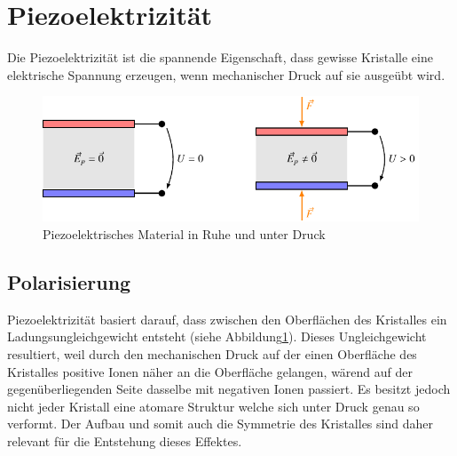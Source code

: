 \section{Piezoelektrizität}
Die Piezoelektrizität ist die spannende Eigenschaft, dass gewisse Kristalle eine elektrische Spannung erzeugen, wenn mechanischer Druck auf sie ausgeübt wird.

\begin{figure}
    \centering
    \includegraphics[]{papers/punktgruppen/figures/piezo} %
    \caption{Piezoelektrisches Material in Ruhe und unter Druck}
    \label{fig:punktgruppen:basicPiezo}
\end{figure}

\subsection{Polarisierung}
Piezoelektrizität basiert darauf, dass zwischen den Oberflächen des Kristalles ein Ladungsungleichgewicht entsteht (siehe Abbildung\ref{fig:punktgruppen:basicPiezo}).
Dieses Ungleichgewicht resultiert, 
weil durch den mechanischen Druck auf der einen Oberfläche des Kristalles positive Ionen näher an die Oberfläche gelangen,
wärend auf der gegenüberliegenden Seite dasselbe mit negativen Ionen passiert.
Es besitzt jedoch nicht jeder Kristall eine atomare Struktur welche sich unter Druck genau so verformt.
Der Aufbau und somit auch die Symmetrie des Kristalles sind daher relevant für die Entstehung dieses Effektes.

